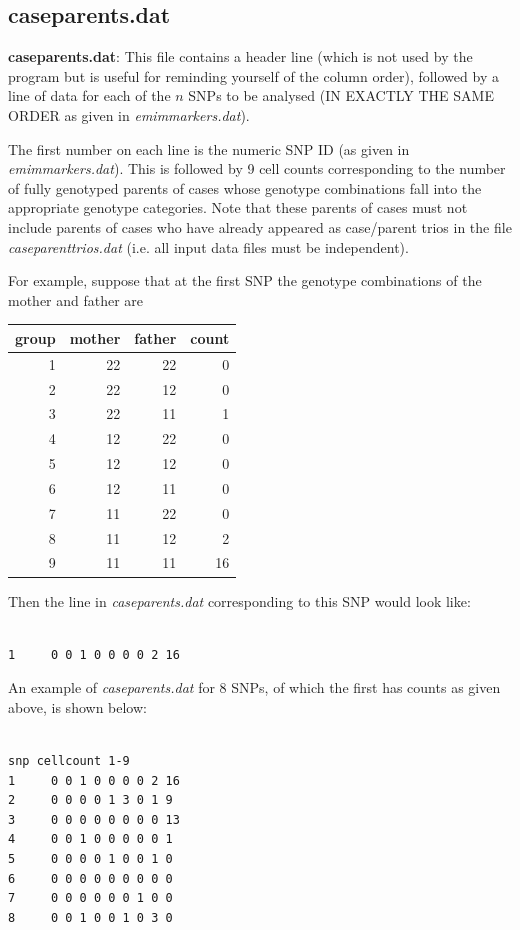 \documentclass[a4paper,12pt]{article}
\begin{document}
\subsection{caseparents.dat}
\label{caseparents}

{\bf caseparents.dat}: This file contains a header line (which is not used by the program but is useful for reminding yourself of the column order), followed by a line of data for each of the $n$ SNPs to be analysed (IN EXACTLY THE SAME ORDER as given in {\it emimmarkers.dat}). 

The first number on each line is the numeric SNP ID (as given in {\it emimmarkers.dat}). This is followed by 9 cell counts corresponding to the number of fully genotyped parents of cases whose genotype combinations fall into the appropriate genotype categories. Note that these parents of cases must not include parents of cases who have already appeared as case/parent trios in the file {\it caseparenttrios.dat} (i.e. all input data files must be independent). 

For example, suppose that at the first SNP the genotype combinations of the mother and father are 

{\begin{center}\begin{tabular}{rrrr}
group  & mother  & father  & count\\
\hline
1  & 22  & 22  & 0\\
2  & 22  & 12  & 0\\
3  & 22  & 11  & 1\\
4  & 12  & 22  & 0\\
5  & 12  & 12  & 0\\
6  & 12  & 11  & 0\\
7  & 11  & 22  & 0\\
8  & 11  & 12  & 2\\
9  & 11  & 11  & 16\\
\end{tabular}\end{center}}

Then the line in {\it caseparents.dat} corresponding to this SNP would look like: 
\vspace{0.35cm} \begin{lstlisting}

1     0 0 1 0 0 0 0 2 16

\end{lstlisting} \vspace{0.35cm}
An example of {\it caseparents.dat} for 8 SNPs, of which the first has counts as given above, is shown below: 
\vspace{0.35cm} \begin{lstlisting}

snp cellcount 1-9
1     0 0 1 0 0 0 0 2 16
2     0 0 0 0 1 3 0 1 9
3     0 0 0 0 0 0 0 0 13
4     0 0 1 0 0 0 0 0 1
5     0 0 0 0 1 0 0 1 0
6     0 0 0 0 0 0 0 0 0
7     0 0 0 0 0 0 1 0 0
8     0 0 1 0 0 1 0 3 0

\end{lstlisting} \vspace{0.35cm}
\end{document}
